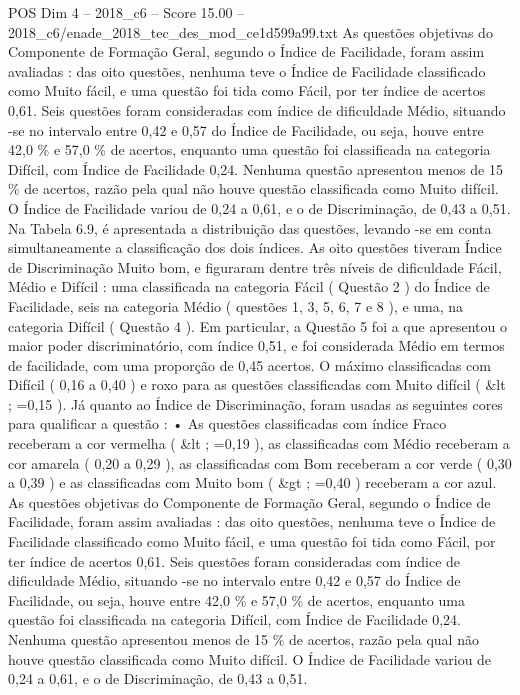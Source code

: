 \begin{textsample}{POS Dim 4 – 2018\_c6 – Score 15.00 – 2018\_c6/enade\_2018\_tec\_des\_mod\_ce1d599a99.txt}
As questões objetivas do Componente de Formação Geral, segundo o Índice de Facilidade, foram assim avaliadas : das oito questões, nenhuma teve o Índice de Facilidade classificado como Muito fácil, e uma questão foi tida como Fácil, por ter índice de acertos 0,61.
Seis questões foram consideradas com índice de dificuldade Médio, situando -se no intervalo entre 0,42 e 0,57 do Índice de Facilidade, ou seja, houve entre 42,0 \% e 57,0 \% de acertos, enquanto uma questão foi classificada na categoria Difícil, com Índice de Facilidade 0,24.
Nenhuma questão apresentou menos de 15 \% de acertos, razão pela qual não houve questão classificada como Muito difícil.
O Índice de Facilidade variou de 0,24 a 0,61, e o de Discriminação, de 0,43 a 0,51.
Na Tabela 6.9, é apresentada a distribuição das questões, levando -se em conta simultaneamente a classificação dos dois índices.
As oito questões tiveram Índice de Discriminação Muito bom, e figuraram dentre três níveis de dificuldade Fácil, Médio e Difícil : uma classificada na categoria Fácil ( Questão 2 ) do Índice de Facilidade, seis na categoria Médio ( questões 1, 3, 5, 6, 7 e 8 ), e uma, na categoria Difícil ( Questão 4 ).
Em particular, a Questão 5 foi a que apresentou o maior poder discriminatório, com índice 0,51, e foi considerada Médio em termos de facilidade, com uma proporção de 0,45 acertos.
O máximo classificadas com Difícil ( 0,16 a 0,40 ) e roxo para as questões classificadas com Muito difícil ( \&lt ; =0,15 ).
Já quanto ao Índice de Discriminação, foram usadas as seguintes cores para qualificar a questão : • As questões classificadas com índice Fraco receberam a cor vermelha ( \&lt ; =0,19 ), as classificadas com Médio receberam a cor amarela ( 0,20 a 0,29 ), as classificadas com Bom receberam a cor verde ( 0,30 a 0,39 ) e as classificadas com Muito bom ( \&gt ; =0,40 ) receberam a cor azul.
As questões objetivas do Componente de Formação Geral, segundo o Índice de Facilidade, foram assim avaliadas : das oito questões, nenhuma teve o Índice de Facilidade classificado como Muito fácil, e uma questão foi tida como Fácil, por ter índice de acertos 0,61.
Seis questões foram consideradas com índice de dificuldade Médio, situando -se no intervalo entre 0,42 e 0,57 do Índice de Facilidade, ou seja, houve entre 42,0 \% e 57,0 \% de acertos, enquanto uma questão foi classificada na categoria Difícil, com Índice de Facilidade 0,24.
Nenhuma questão apresentou menos de 15 \% de acertos, razão pela qual não houve questão classificada como Muito difícil.
O Índice de Facilidade variou de 0,24 a 0,61, e o de Discriminação, de 0,43 a 0,51.

\end{textsample}

